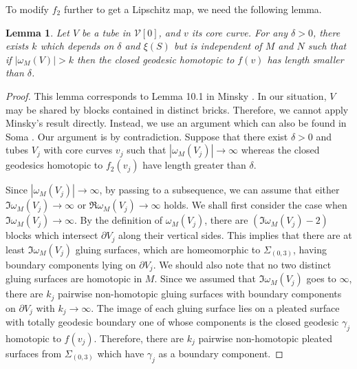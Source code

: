 \documentclass{amsart}
\newtheorem{lemma}[theorem]{Lemma}
\theoremstyle{definition}
\numberwithin{figure}{section}
\numberwithin{equation}{section}
\def\pants{\Sigma_{(0,3)}}
\def\cv{\mathcal{V}}
\begin{document}
To modify $f_2$ further to get a Lipschitz map, we need the following lemma.

\begin{lemma}
\label{large k}
Let $V$ be a tube in $\cv[0]$, and $v$ its core curve.
For any $\delta>0$, there exists $k$ which depends on $\delta$ and $\xi(S)$ but is independent of $M$ and $N$ such that if $|\omega_M(V)|> k$ then the closed geodesic homotopic to $f(v)$ has length smaller than $\delta$.
\end{lemma}
\begin{proof}
This lemma corresponds to Lemma 10.1 in Minsky \cite{mi2}.
In our situation, $V$ may be shared by blocks contained in distinct bricks.
Therefore, we cannot apply Minsky's result directly.
Instead, we use an argument which can also be found in Soma \cite{so}.
Our argument is by contradiction.
Suppose that there exist $\delta >0$ and tubes $V_j$ with core curves $v_j$ such that $|\omega_M(V_j)| \rightarrow \infty$ whereas the closed geodesics homotopic to $f_2(v_j)$ have length greater than $\delta$.

Since $|\omega_M(V_j)| \rightarrow \infty$, by passing to a subsequence, we can assume that either $\Im \omega_M(V_j) \rightarrow \infty$ or $\Re \omega_M(V_j) \rightarrow \infty$ holds.
We shall first consider the case when $\Im \omega_M(V_j) \rightarrow \infty$.
By the definition of $\omega_M(V_j)$, there are $(\Im \omega_M(V_j)-2)$ blocks which intersect $\partial V_j$ along their vertical sides.
This implies that there are at least $\Im \omega_M(V_j)$ gluing surfaces, which are homeomorphic to $\pants$, having boundary components lying on $\partial V_j$.
We should also note that no two distinct gluing surfaces are homotopic in $M$.
Since we assumed that $\Im \omega_M(V_j)$ goes to $\infty$, there are $k_j$ pairwise non-homotopic gluing surfaces with boundary components on $\partial V_j$ with $k_j \rightarrow \infty$.
The image of each gluing surface lies on a pleated surface with totally geodesic boundary one of whose components is the closed geodesic $\gamma_j$ homotopic to $f(v_j)$.
Therefore, there are $k_j$ pairwise non-homotopic pleated surfaces from $\pants$ which have $\gamma_j$ as a boundary component.


\end{proof}
\end{document}

